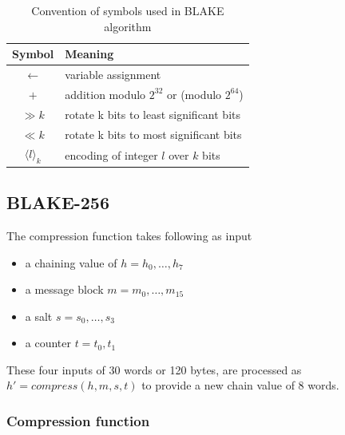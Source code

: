 \begin{table}[h]
  \begin{center}
    \begin{tabular}{ c l } \hline
      Symbol                  & Meaning \\ \hline
      $\gets$                 & variable assignment \\
      $+$                     & addition modulo $2^{32}$ or (modulo $2^{64}$) \\
      $\gg k$                 & rotate k bits to least significant bits \\
      $\ll k$                 & rotate k bits to most significant bits \\
      $\langle l \rangle_{k}$ & encoding of integer $l$ over $k$ bits \\ \hline
    \end{tabular}
    \caption{Convention of symbols used in BLAKE algorithm}
  \end{center}
\end{table}

\subsection{ BLAKE-256 }

The compression function takes following as input
\begin{itemize}
  \item a chaining value of $h = h_{0},\dots, h_{7}$
  \item a message block $m = m_{0},\dots, m_{15}$
  \item a salt $s = s_{0},\dots, s_{3}$
  \item a counter $t = t_{0}, t_{1}$
\end{itemize}
These four inputs of 30 words or 120 bytes, are processed as $h' = compress(h, m, s, t)$ to provide a new
chain value of 8 words.

  \subsubsection{Compression function}

